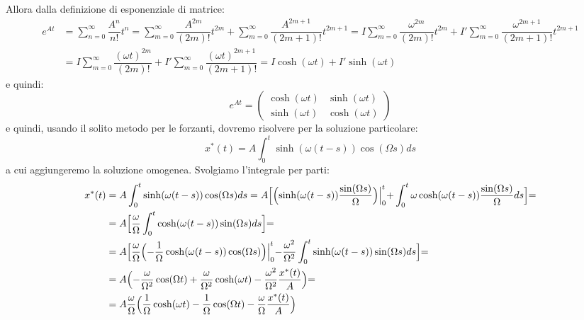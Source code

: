 \documentclass[a4paper,openany]{article}
\begin{document}
	Allora dalla definizione di esponenziale di matrice:
	\begin{equation}
		\begin{aligned}
			e^{At} &= \sum_{n=0}^{\infty} \dfrac{A^{n}}{n!}t^{n} = \sum_{m=0}^{\infty}\dfrac{A^{2m}}{(2m)!}t^{2m} + \sum_{m=0}^{\infty}\dfrac{A^{2m+1}}{(2m+1)!}t^{2m+1} =  I \sum_{m=0}^{\infty}\dfrac{\omega^{2m}}{(2m)!}t^{2m} + I' \sum_{m=0}^{\infty}\dfrac{\omega^{2m+1}}{(2m+1)!}t^{2m+1} \\
			&= I \sum_{m=0}^{\infty}\dfrac{(\omega t)^{2m}}{(2m)!} + I' \sum_{m=0}^{\infty}\dfrac{(\omega t)^{2m+1}}{(2m+1)!} = I \cosh(\omega t) + I'\sinh(\omega t)
		\end{aligned}
	\end{equation}
	e quindi:
	\begin{equation}\label{key}
		e^{At} = \begin{pmatrix}
			\cosh(\omega t) & \sinh(\omega t) \\
			\sinh(\omega t) & \cosh(\omega t)
		\end{pmatrix}
	\end{equation}
	e quindi, usando il solito metodo per le forzanti, dovremo risolvere per la soluzione particolare:
	\begin{equation}\label{key}
		x^{*}(t) = A \int_{0}^{t}\sinh(\omega (t-s))\cos(\Omega s) ds
	\end{equation}
	a cui aggiungeremo la soluzione omogenea. Svolgiamo l'integrale per parti:
	\begin{equation}\label{key}
		\begin{aligned}
			x^{*}(t) &= A \int_{0}^{t}\sinh(\omega (t-s))\cos(\Omega s) ds = A\Bigl[\Bigl(\sinh(\omega(t-s)) \dfrac{\sin(\Omega s)}{\Omega}\Bigl)\Bigl|_{0}^{t} + \int_{0}^{t}\omega\cosh(\omega(t-s)) \dfrac{\sin(\Omega s)}{\Omega}ds\Bigl] =
			\\ 
			&= A\Bigl[ \dfrac{\omega}{\Omega}\int_{0}^{t}\cosh(\omega(t-s))\sin(\Omega s)ds\Bigl] = 
			\\
			&= A \Bigl[ \dfrac{\omega}{\Omega}\Bigl(-\dfrac{1}{\Omega}\cosh(\omega(t-s))\cos(\Omega s)\Bigl)\Bigl|_{0}^{t}-\dfrac{\omega^2}{\Omega^2}\int_{0}^{t}\sinh(\omega(t-s))\sin(\Omega s)ds\Bigl] =\\
			&= A\Bigl(- \dfrac{\omega}{\Omega^2}\cos(\Omega t)+ \dfrac{\omega}{\Omega^2}\cosh(\omega t) - \dfrac{\omega^2}{\Omega^2}\dfrac{x^{*}(t)}{A}\Bigl) = \\
			&= A \dfrac{\omega}{\Omega}\Bigl(\dfrac{1}{\Omega}\cosh(\omega t)-\dfrac{1}{\Omega}\cos(\Omega t)- \dfrac{\omega}{\Omega}\dfrac{x^{*}(t)}{A}  \Bigl) 
		\end{aligned}
	\end{equation}
\end{document}
